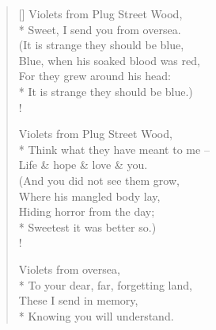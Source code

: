 \documentclass[MAIN]{subfiles}
\begin{document}
\begin{verse}[\versewidth]
Violets from {\sc Plug Street Wood},\\*
Sweet, I send you from oversea.\\
(It is strange they should be blue,\\
Blue, when his soaked blood was red,\\
For they grew around his head:\\*
It is strange they should be blue.)\\!

Violets from {\sc Plug Street Wood},\\*
Think what they have meant to me --\\
Life \& hope \& love \& you.\\
(And you did not see them grow,\\
Where his mangled body lay,\\
Hiding horror from the day;\\*
Sweetest it was better so.)\\!

Violets from oversea,\\*
To your dear, far, forgetting land,\\
These I send in memory,\\*
Knowing you will understand.
\end{verse}
\end{document}
